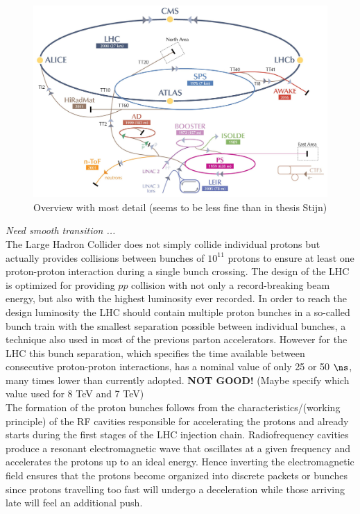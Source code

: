 \begin{figure}[h!t]
 \centering
 \includegraphics[width = 0.99 \textwidth]{Chapters/Chapter2_CERN/Figures/CERNAcceleratorComplex_Detail.jpg}
 \caption{Overview with most detail (seems to be less fine than in thesis Stijn)} \label{fig::LHCChain}
\end{figure}
\textit{Need smooth transition ...}\\
The Large Hadron Collider does not simply collide individual protons but actually provides collisions between bunches of $10^{11}$ protons to ensure at least one proton-proton interaction during a single bunch crossing. The design of the LHC is optimized for providing $pp$ collision with not only a record-breaking beam energy, but also with the highest luminosity ever recorded. In order to reach the design luminosity the LHC should contain multiple proton bunches in a so-called bunch train with the smallest separation possible between individual bunches, a technique also used in most of the previous parton accelerators. 
However for the LHC this bunch separation, which specifies the time available between consecutive proton-proton interactions, has a nominal value of only 25 or 50 $\ns$, many times lower than currently adopted. \textbf{NOT GOOD!} (Maybe specify which value used for 8 TeV and 7 TeV)
\\
The formation of the proton bunches follows from the characteristics/(working principle) of the RF cavities responsible for accelerating the protons and already starts during the first stages of the LHC injection chain. 
Radiofrequency cavities produce a resonant electromagnetic wave that oscillates at a given frequency and accelerates the protons up to an ideal energy.
Hence inverting the electromagnetic field ensures that the protons become organized into discrete packets or bunches since protons travelling too fast will undergo a deceleration while those arriving late will feel an additional push.
